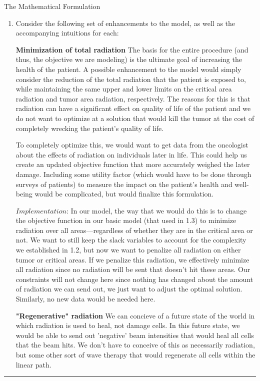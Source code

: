 \documentclass[12pt]{article}
\makeatletter
\newenvironment{task}{\@startsection
       {section}{1}
       {0.4em}{-.5ex plus -1ex minus -.2ex}{.5ex plus .2ex}
       {\pagebreak[3]\large\bf\noindent{Task}}}
       {\nopagebreak[3]\vspace{3ex}\begin{center}\rule{1\linewidth}{.3pt}\end{center}}
\makeatother
\begin{document}
\begin{task}{The Mathematical Formulation}
\begin{enumerate}
Note that our objective function in this case attempts the dual minimization of the slack variables and the radiation being put on the areas adjacent to the critical area (which incorporates our original penalty for hitting this area). 

\item Consider the following set of enhancements to the model, as well as the accompanying intuitions for each:

\textbf{Minimization of total radiation}
The basis for the entire procedure (and thus, the objective we are modeling) is the ultimate goal of increasing the health of the patient. A possible enhancement to the model would simply consider the reduction of the total radiation that the patient is exposed to, while maintaining the same upper and lower limits on the critical area radiation and tumor area radiation, respectively. The reasons for this is that radiation can have a significant effect on quality of life of the patient and we do not want to optimize at a solution that would kill the tumor at the cost of completely wrecking the patient's quality of life. 

To completely optimize this, we would want to get data from the oncologist about the effects of radiation on individuals later in life. This could help us create an updated objective function that more accurately weighed the later damage. Including some utility factor (which would have to be done through surveys of patients) to measure the impact on the patient's health and well-being would be complicated, but would finalize this formulation. 

$Implementation$: In our model, the way that we would do this is to change the objective function in our basic model (that used in 1.3) to minimize radiation over all areas—regardless of whether they are in the critical area or not. We want to still keep the slack variables to account for the complexity we established in 1.2, but now we want to penalize all radiation on either tumor or critical areas. If we penalize this radiation, we effectively minimize all radiation since no radiation will be sent that doesn't hit these areas. Our constraints will not change here since nothing has changed about the amount of radiation we can send out, we just want to adjust the optimal solution. Similarly, no new data would be needed here. 

\textbf{"Regenerative" radiation}
We can concieve of a future state of the world in which radiation is used to heal, not damage cells. In this future state, we would be able to send out 'negative' beam intensities that would heal all cells that the beam hits. We don't have to conceive of this as necessarily radiation, but some other sort of wave therapy that would regenerate all cells within the linear path. 


\end{enumerate}
\end{task}
\end{document}
